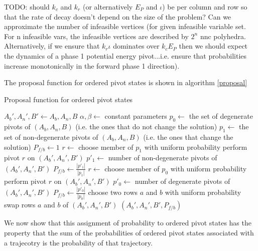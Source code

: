 \documentclass{article}
\begin{document}
TODO: should $k_c$ and $k_r$ (or alternatively $E_P$ and $\iota$) be per column and row so that the rate of decay doesn't depend on the size of the problem? Can we approximate the number of infeasible vertices (for given infeasible variable set. For n infeasible vars, the infeasible vertices are described by $2^n$ nnc polyhedra. Alternatively, if we ensure that $k_r\iota$ dominates over $k_cE_P$ then we should expect the dynamics of a phase 1 potential energy pivot...i.e. ensure that probabilities increase monotonically in the forward phase 1 direction).


The proposal function for ordered pivot states is shown in algorithm \ref{proposal}

\begin{algorithm}
	\caption{Proposal function for ordered pivot states}
	\label{proposal}
	\begin{algorithmic}
		 
		\State $A_b',A_n',B' \leftarrow A_b,A_n,B$
		\State $\alpha, \beta \leftarrow$ constant parameters
		\State $p_0 \leftarrow$ the set of degenerate pivots of $(A_b,A_n,B)$ (i.e. the ones that do not change the solution)
		\State $p_1 \leftarrow$ the set of non-degenerate pivots of $(A_b,A_n,B)$ (i.e. the ones that change the solution)
		\State $P_{f/b} \leftarrow 1$ 
		\State $r \leftarrow$ choose member of $p_1$ with uniform probability
		\State perform pivot $r$ on $(A_b',A_n',B')$
		\State $p'_1 \leftarrow $ number of non-degenerate pivots of $(A_b',A_n',B')$
		\State $P_{f/b} \leftarrow \frac{|p'_1|}{|p_1|}$
		\State $r \leftarrow$ choose member of $p_0$ with uniform probability
		\State perform pivot $r$ on $(A_b',A_n',B')$
		\State $p'_0 \leftarrow $ number of degenerate pivots of $(A_b',A_n',B')$
		\State $P_{f/b} \leftarrow \frac{|p'_0|}{|p_0|}$
		\Else
		\State choose two rows $a$ and $b$ with uniform probability
		\State swap rows $a$ and $b$ of $(A_b',A_n',B')$
		\EndIf
		\State \Return $(A_b',A_n',B',P_{f/b})$
		\EndFunction
	\end{algorithmic}
\end{algorithm}



We now show that this assignment of probability to ordered pivot states has the property that the sum of the probabilities of ordered pivot states associated with a trajecotry is the probability of that trajectory.
\end{document}
